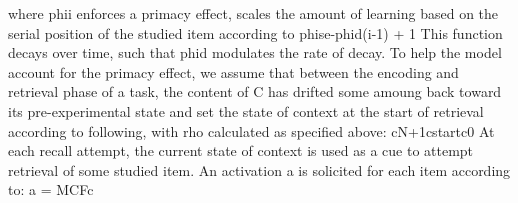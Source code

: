 {}where \markdownRendererDollarSign{}\markdownRendererBackslash{}phi\markdownRendererUnderscore{}i\markdownRendererDollarSign{} enforces a primacy effect, scales the amount of learning based on the serial position of the studied item according to\markdownRendererInterblockSeparator
{}\markdownRendererDollarSign{}\markdownRendererDollarSign{}\markdownRendererBackslash{}phise\markdownRendererCircumflex{}\markdownRendererLeftBrace{}-\markdownRendererBackslash{}phi\markdownRendererUnderscore{}d(i-1)\markdownRendererRightBrace{} + 1\markdownRendererDollarSign{}\markdownRendererDollarSign{}\markdownRendererInterblockSeparator
{}This function decays over time, such that \markdownRendererDollarSign{}\markdownRendererBackslash{}phid\markdownRendererDollarSign{} modulates the rate of decay.\markdownRendererInterblockSeparator
{}\markdownRendererInterblockSeparator
{}To help the model account for the primacy effect, we assume that between the encoding and retrieval phase of a task, the content of \markdownRendererDollarSign{}C\markdownRendererDollarSign{} has drifted some amoung back toward its pre-experimental state and set the state of context at the start of retrieval according to following, with \markdownRendererDollarSign{}\markdownRendererBackslash{}rho\markdownRendererDollarSign{} calculated as specified above:\markdownRendererInterblockSeparator
{}\markdownRendererDollarSign{}\markdownRendererDollarSign{}c\markdownRendererLeftBrace{}N+1\markdownRendererRightBrace{}c\markdownRendererLeftBrace{}start\markdownRendererRightBrace{}c\markdownRendererUnderscore{}0\markdownRendererDollarSign{}\markdownRendererDollarSign{}\markdownRendererInterblockSeparator
{}At each recall attempt, the current state of context is used as a cue to attempt retrieval of some studied item. An activation \markdownRendererDollarSign{}a\markdownRendererDollarSign{} is solicited for each item according to:\markdownRendererInterblockSeparator
{}\markdownRendererDollarSign{}\markdownRendererDollarSign{}a = M\markdownRendererCircumflex{}\markdownRendererLeftBrace{}CF\markdownRendererRightBrace{}c\markdownRendererDollarSign{}\markdownRendererDollarSign{}\markdownRendererInterblockSeparator
